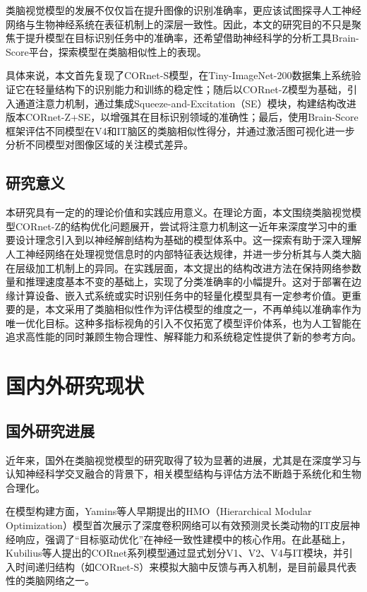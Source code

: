 类脑视觉模型的发展不仅仅旨在提升图像的识别准确率，更应该试图探寻人工神经网络与生物神经系统在表征机制上的深层一致性。因此，本文的研究目的不只是聚焦于提升模型在目标识别任务中的准确率，还希望借助神经科学的分析工具Brain-Score平台，探索模型在类脑相似性上的表现。

具体来说，本文首先复现了CORnet-S模型，在Tiny-ImageNet-200数据集上系统验证它在轻量结构下的识别能力和训练的稳定性；随后以CORnet-Z模型为基础，引入通道注意力机制，通过集成Squeeze-and-Excitation（SE）模块，构建结构改进版本CORnet-Z+SE，以增强其在目标识别领域的准确性；最后，使用Brain-Score框架评估不同模型在V4和IT脑区的类脑相似性得分，并通过激活图可视化进一步分析不同模型对图像区域的关注模式差异。

\subsection{研究意义}

本研究具有一定的的理论价值和实践应用意义。在理论方面，本文围绕类脑视觉模型CORnet-Z的结构优化问题展开，尝试将注意力机制这一近年来深度学习中的重要设计理念引入到以神经解剖结构为基础的模型体系中。这一探索有助于深入理解人工神经网络在处理视觉信息时的内部特征表达规律，并进一步分析其与人类大脑在层级加工机制上的异同。在实践层面，本文提出的结构改进方法在保持网络参数量和推理速度基本不变的基础上，实现了分类准确率的小幅提升。这对于部署在边缘计算设备、嵌入式系统或实时识别任务中的轻量化模型具有一定参考价值。更重要的是，本文采用了类脑相似性作为评估模型的维度之一，不再单纯以准确率作为唯一优化目标。这种多指标视角的引入不仅拓宽了模型评价体系，也为人工智能在追求高性能的同时兼顾生物合理性、解释能力和系统稳定性提供了新的参考方向。

\section{国内外研究现状}

\subsection{国外研究进展}

近年来，国外在类脑视觉模型的研究取得了较为显著的进展，尤其是在深度学习与认知神经科学交叉融合的背景下，相关模型结构与评估方法不断趋于系统化和生物合理化。

在模型构建方面，Yamins等人早期提出的HMO（Hierarchical Modular Optimization）模型首次展示了深度卷积网络可以有效预测灵长类动物的IT皮层神经响应，强调了“目标驱动优化”在神经一致性建模中的核心作用\cite{yamins2014performance}。在此基础上，Kubilius等人提出的CORnet系列模型通过显式划分V1、V2、V4与IT模块，并引入时间递归结构（如CORnet-S）来模拟大脑中反馈与再入机制，是目前最具代表性的类脑网络之一\cite{kubilius2018cornet}。

